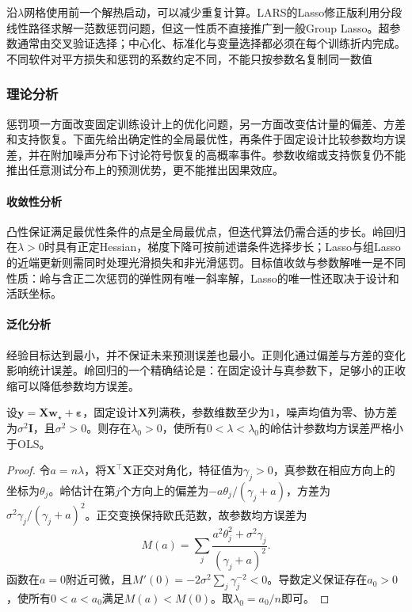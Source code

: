 沿$\lambda$网格使用前一个解热启动，可以减少重复计算。LARS的Lasso修正版利用分段线性路径求解一范数惩罚问题，但这一性质不直接推广到一般Group Lasso。超参数通常由交叉验证选择；中心化、标准化与变量选择都必须在每个训练折内完成。不同软件对平方损失和惩罚的系数约定不同，不能只按参数名复制同一数值

\subsubsection{理论分析}
\label{sec:regression-regularization-theory}

惩罚项一方面改变固定训练设计上的优化问题，另一方面改变估计量的偏差、方差和支持恢复。下面先给出确定性的全局最优性，再条件于固定设计比较参数均方误差，并在附加噪声分布下讨论符号恢复的高概率事件。参数收缩或支持恢复仍不能推出任意测试分布上的预测优势，更不能推出因果效应。

\paragraph{收敛性分析}
凸性保证满足最优性条件的点是全局最优点，但迭代算法仍需合适的步长。岭回归在$\lambda>0$时具有正定Hessian，梯度下降可按前述谱条件选择步长；Lasso与组Lasso的近端更新则需同时处理光滑损失和非光滑惩罚。目标值收敛与参数解唯一是不同性质：岭与含正二次惩罚的弹性网有唯一斜率解，Lasso的唯一性还取决于设计和活跃坐标。

\paragraph{泛化分析}
经验目标达到最小，并不保证未来预测误差也最小。正则化通过偏差与方差的变化影响统计误差。岭回归的一个精确结论是：在固定设计与真参数下，足够小的正收缩可以降低参数均方误差。

\begin{theorem}[小幅岭收缩的参数均方误差]
  \label{thm:regression-ridge-mse}
  设$\bm{y}=\bm{X}\bm{w}_{\star}+\bm{\varepsilon}$，固定设计$\bm{X}$列满秩，参数维数至少为$1$，噪声均值为零、协方差为$\sigma^2\bm{I}$，且$\sigma^2>0$。则存在$\lambda_0>0$，使所有$0<\lambda<\lambda_0$的岭估计参数均方误差严格小于OLS。
\end{theorem}

\begin{proof}
令$a=n\lambda$，将$\bm{X}^{\top}\bm{X}$正交对角化，特征值为$\gamma_j>0$，真参数在相应方向上的坐标为$\theta_j$。岭估计在第$j$个方向上的偏差为$-a\theta_j/(\gamma_j+a)$，方差为$\sigma^2\gamma_j/(\gamma_j+a)^2$。正交变换保持欧氏范数，故参数均方误差为
\[
  M(a)=\sum_j\frac{a^2\theta_j^2+\sigma^2\gamma_j}{(\gamma_j+a)^2}.
\]
函数在$a=0$附近可微，且$M'(0)=-2\sigma^2\sum_j\gamma_j^{-2}<0$。导数定义保证存在$a_0>0$，使所有$0<a<a_0$满足$M(a)<M(0)$。取$\lambda_0=a_0/n$即可。
\end{proof}

